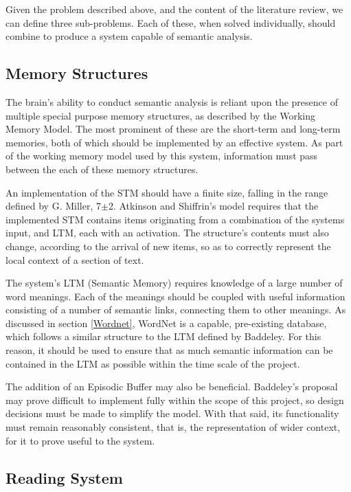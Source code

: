 \documentclass[]{article}
\begin{document}
Given the problem described above, and the content of the literature review, we can define three sub-problems. Each of these, when solved individually, should combine to produce a system capable of semantic analysis.

\subsection{Memory Structures}
\label{sec:PAMem}

The brain’s ability to conduct semantic analysis is reliant upon the presence of multiple special purpose memory structures, as described by the Working Memory Model. The most prominent of these are the short-term and long-term memories, both of which should be implemented by an effective system. As part of the working memory model used by this system, information must pass between the each of these memory structures. 

An implementation of the STM should have a finite size, falling in the range defined by G. Miller, 7$\pm$2.  Atkinson and Shiffrin’s model requires that the implemented STM contains items originating from a combination of the systems input, and LTM, each with an activation. The structure’s contents must also change, according to the arrival of new items, so as to correctly represent the local context of a section of text.

The system's LTM (Semantic Memory) requires knowledge of a large number of word meanings. Each of the meanings should be coupled with useful information consisting of a number of semantic links, connecting them to other meanings. As discussed in section \ref{Wordnet}, WordNet is a capable, pre-existing database, which follows a similar structure to the LTM defined by Baddeley. For this reason, it should be used to ensure that as much semantic information can be contained in the LTM as possible within the time scale of the project.

The addition of an Episodic Buffer may also be beneficial. Baddeley’s proposal may prove difficult to implement fully within the scope of this project, so design decisions must be made to simplify the model. With that said, its functionality must remain reasonably consistent, that is, the representation of wider context, for it to prove useful to the system.

\subsection{Reading System}
\label{sec:PARead}
\end{document}

